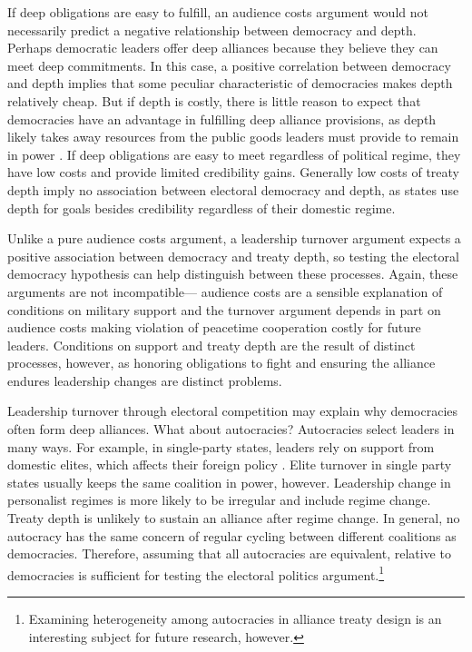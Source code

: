 \documentclass[12pt]{article}
\begin{document}
If deep obligations are easy to fulfill, an audience costs argument would not necessarily predict a negative relationship between democracy and depth. 
Perhaps democratic leaders offer deep alliances because they believe they can meet deep commitments. 
In this case, a positive correlation between democracy and depth implies that some peculiar characteristic of democracies makes depth relatively cheap. 
But if depth is costly, there is little reason to expect that democracies have an advantage in fulfilling deep alliance provisions, as depth likely takes away resources from the public goods leaders must provide to remain in power \citep{BDMetal2002}. 
If deep obligations are easy to meet regardless of political regime, they have low costs and provide limited credibility gains. 
Generally low costs of treaty depth imply no association between electoral democracy and depth, as states use depth for goals besides credibility regardless of their domestic regime. 


Unlike a pure audience costs argument, a leadership turnover argument expects a positive association between democracy and treaty depth, so testing the electoral democracy hypothesis can help distinguish between these processes.  
Again, these arguments are not incompatible--- audience costs are a sensible explanation of conditions on military support and the turnover argument depends in part on audience costs making violation of peacetime cooperation costly for future leaders. 
Conditions on support and treaty depth are the result of distinct processes, however, as honoring obligations to fight and ensuring the alliance endures leadership changes are distinct problems.  


Leadership turnover through electoral competition may explain why democracies often form deep alliances. 
What about autocracies? 
Autocracies select leaders in many ways. 
For example, in single-party states, leaders rely on support from domestic elites, which affects their foreign policy \citep{Weeks2014}.
Elite turnover in single party states usually keeps the same coalition in power, however.  
Leadership change in personalist regimes is more likely to be irregular and include regime change.
Treaty depth is unlikely to sustain an alliance after regime change.  
In general, no autocracy has the same concern of regular cycling between different coalitions as democracies.
Therefore, assuming that all autocracies are equivalent, relative to democracies is sufficient for testing the electoral politics argument.\footnote{Examining heterogeneity among autocracies in alliance treaty design is an interesting subject for future research, however.} 
\end{document}
